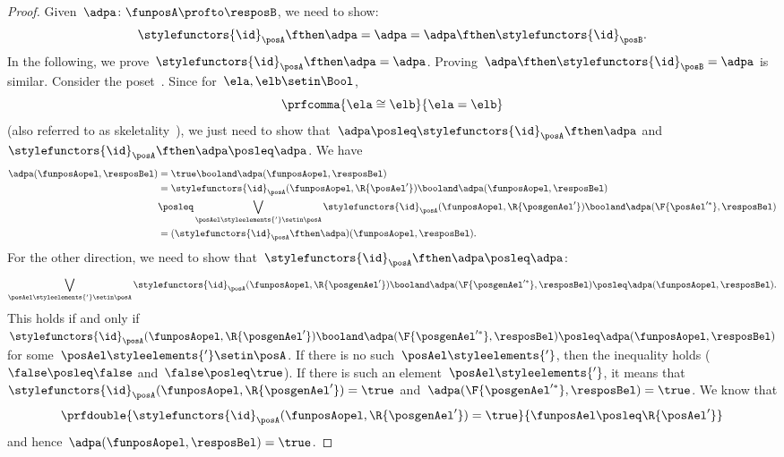 \begin{proof}
    Given~$\adpa\colon \funposA\profto \resposB$, we need to show:
    \begin{equation}
        \stylefunctors{\id}_\posA \fthen \adpa = \adpa = \adpa \fthen \stylefunctors{\id}_\posB.
    \end{equation}
    In the following, we prove~$\stylefunctors{\id}_\posA \fthen \adpa = \adpa$.
    Proving~$\adpa\fthen \stylefunctors{\id}_\posB=\adpa$ is similar.
    Consider the poset~\Bool.
    Since for~$\ela,\elb\setin \Bool$,
    \begin{equation}
        \prfcomma{
            \ela\cong \elb
        }{
            \ela=\elb
        }
    \end{equation}
    (also referred to as skeletality~\cite{fong2019}), we just need to show that~$\adpa\posleq \stylefunctors{\id}_\posA\fthen \adpa$ and~$\stylefunctors{\id}_\posA\fthen \adpa\posleq \adpa$.
    We have
    \begin{equation}
        \label{eq:dp_unit_1}
        \begin{aligned}
            \adpa(\funposAopel,\resposBel) & =\true \booland \adpa(\funposAopel,\resposBel) \\
                                           & = \stylefunctors{\id}_\posA(\funposAopel,\R{\posAel'}) \booland \adpa(\funposAopel,\resposBel) \\
                                           & \posleq \bigvee_{\posAel\styleelements{'} \setin \posA}\stylefunctors{\id}_\posA(\funposAopel,\R{\posgenAel'})\booland \adpa(\F{\posAel'^*},\resposBel) \\
                                           & =(\stylefunctors{\id}_\posA\fthen \adpa)(\funposAopel,\resposBel).
        \end{aligned}
    \end{equation}
    For the other direction, we need to show that~$\stylefunctors{\id}_\posA\fthen \adpa\posleq \adpa$:
    \begin{equation}
        \label{eq:dp_unit_2}
        \bigvee_{\posAel\styleelements{'}\setin \posA}\stylefunctors{\id}_\posA(\funposAopel,\R{\posgenAel'})\booland \adpa(\F{\posgenAel'^*},\resposBel) \posleq \adpa(\funposAopel,\resposBel).
    \end{equation}
    This holds if and only if~$\stylefunctors{\id}_\posA(\funposAopel,\R{\posgenAel'})\booland \adpa(\F{\posgenAel'^*},\resposBel) \posleq \adpa(\funposAopel,\resposBel)$ for some~$\posAel\styleelements{'}\setin \posA$.
    If there is no such~$\posAel\styleelements{'}$, then the inequality holds ($\false \posleq \false$ and~$\false \posleq \true$).
    If there is such an element~$\posAel\styleelements{'}$, it means that~$\stylefunctors{\id}_\posA(\funposAopel,\R{\posgenAel'})=\true$ and~$\adpa(\F{\posgenAel'^*},\resposBel)=\true$.
    We know that
    \begin{equation}
        \prfdouble{\stylefunctors{\id}_\posA(\funposAopel,\R{\posgenAel'})=\true}{\funposAel \posleq \R{\posAel'}}
    \end{equation}
    and hence~$\adpa(\funposAopel,\resposBel)=\true$.
\end{proof}

